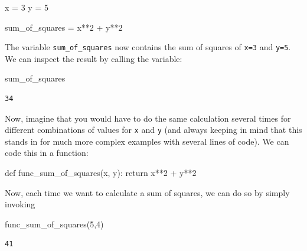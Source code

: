 \documentclass[
  a4paperpaper,
  ,captions=tableheading
]{scrbook}
\newenvironment{Shaded}{\begin{snugshade}}{\end{snugshade}}
\newcommand{\ControlFlowTok}[1]{\textcolor[rgb]{0.00,0.23,0.31}{#1}}
\newcommand{\DecValTok}[1]{\textcolor[rgb]{0.68,0.00,0.00}{#1}}
\newcommand{\KeywordTok}[1]{\textcolor[rgb]{0.00,0.23,0.31}{#1}}
\newcommand{\NormalTok}[1]{\textcolor[rgb]{0.00,0.23,0.31}{#1}}
\newcommand{\OperatorTok}[1]{\textcolor[rgb]{0.37,0.37,0.37}{#1}}
\begin{document}
\begin{Shaded}
\begin{Highlighting}[]
\NormalTok{x }\OperatorTok{=} \DecValTok{3}
\NormalTok{y }\OperatorTok{=} \DecValTok{5}

\NormalTok{sum\_of\_squares }\OperatorTok{=}\NormalTok{ x}\OperatorTok{**}\DecValTok{2} \OperatorTok{+}\NormalTok{ y}\OperatorTok{**}\DecValTok{2}
\end{Highlighting}
\end{Shaded}

The variable \texttt{sum\_of\_squares} now contains the sum of squares
of \texttt{x=3} and \texttt{y=5}. We can inspect the result by calling
the variable:

\begin{Shaded}
\begin{Highlighting}[]
\NormalTok{sum\_of\_squares }
\end{Highlighting}
\end{Shaded}

\begin{verbatim}
34
\end{verbatim}

Now, imagine that you would have to do the same calculation several
times for different combinations of values for \texttt{x} and \texttt{y}
(and always keeping in mind that this stands in for much more complex
examples with several lines of code). We can code this in a function:

\begin{Shaded}
\begin{Highlighting}[]
\KeywordTok{def}\NormalTok{ func\_sum\_of\_squares(x, y):}
    \ControlFlowTok{return}\NormalTok{ x}\OperatorTok{**}\DecValTok{2} \OperatorTok{+}\NormalTok{ y}\OperatorTok{**}\DecValTok{2}
\end{Highlighting}
\end{Shaded}

Now, each time we want to calculate a sum of squares, we can do so by
simply invoking

\begin{Shaded}
\begin{Highlighting}[]
\NormalTok{func\_sum\_of\_squares(}\DecValTok{5}\NormalTok{,}\DecValTok{4}\NormalTok{)}
\end{Highlighting}
\end{Shaded}

\begin{verbatim}
41
\end{verbatim}
\end{document}
